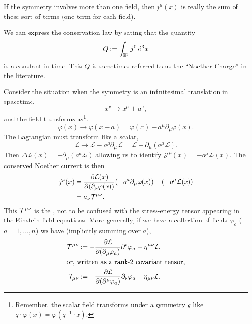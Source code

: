 \begin{remark}
If the symmetry involves more than one field, then $j^{\mu}(x)$ is
really the sum of these sort of terms (one term for each field).
\end{remark}

We can express the conservation law by sating that the quantity
\begin{equation}
Q := \int_{\mathbb{R}^{3}}j^{0}\,\mathrm{d}^{3}x
\end{equation}
is a constant in time. This $Q$ is sometimes referred to as the
``Noether Charge'' in the literature.

\begin{example}\label{ex:classical-field-theory:noether:canonical-stress-energy}
Consider the situation when the symmetry is an infinitesimal translation
in spacetime,
\begin{equation}
x^{\mu}\to x^{\mu} + a^{\mu},
\end{equation}
and the field transforms as\footnote{Remember, the scalar field
transforms under a symmetry $g$ like
$g\cdot\varphi(x)=\varphi(g^{-1}\cdot x)$.}:
\begin{equation}
\varphi(x)\to\varphi(x-a)=\varphi(x)-a^{\mu}\partial_{\mu}\varphi(x).
\end{equation}
The Lagrangian must transform like a scalar,
\begin{equation}
\mathcal{L}\to\mathcal{L}-a^{\mu}\partial_{\mu}\mathcal{L}
=\mathcal{L} - \partial_{\mu}(a^{\mu}\mathcal{L}).
\end{equation}
Then $\Delta\mathcal{L}(x)=- \partial_{\mu}(a^{\mu}\mathcal{L})$
allowing us to identify $\mathcal{J}^{\mu}(x)=-a^{\mu}\mathcal{L}(x)$.
The conserved Noether current is then
\begin{equation}
\begin{split}
j^{\mu}(x) &= \frac{\partial\mathcal{L}(x)}{\partial(\partial_{\mu}\varphi(x))}(-a^{\mu}\partial_{\mu}\varphi(x))
- (-a^{\mu}\mathcal{L}(x))\\
&=a_{\nu}\mathcal{T}^{\mu\nu}.
\end{split}
\end{equation}
This $\mathcal{T}^{\mu\nu}$ is the
, not to be confused 
with the stress-energy tensor appearing in the Einstein field equations.
More generally, if we have a collection of fields $\varphi_{a}$ ($a=1,\dots,n$)
we have (implicitly summing over $a$),
\begin{subequations}
\begin{align}
\mathcal{T}^{\mu\nu} &:= -\frac{\partial\mathcal{L}}{\partial(\partial_{\mu}\varphi_{a})}\partial^{\nu}\varphi_{a}+\eta^{\mu\nu}\mathcal{L},\\
\intertext{or, written as a rank-2 covariant tensor,}
\mathcal{T}_{\mu\nu} &:= -\frac{\partial\mathcal{L}}{\partial(\partial^{\mu}\varphi_{a})}\partial_{\nu}\varphi_{a}+\eta_{\mu\nu}\mathcal{L}.
\end{align}
\end{subequations}
\end{example}

